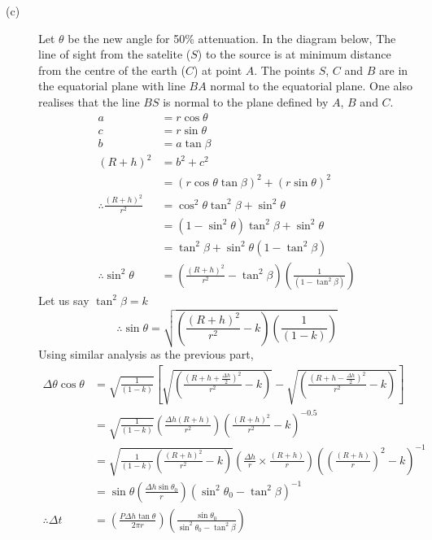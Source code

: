 \begin{description}
\item[(c)] Let $\theta$ be the new angle for 50\% attenuation. In the diagram
below, The line of sight from the satelite %
($S$) to the source is at minimum distance from the centre of the earth ($C$)
at point $A$. The points $S$, $C$ and $B$ are in the equatorial plane with
line $BA$ normal to the equatorial plane. One also realises that the line
$BS$ is normal to the plane defined by $A$, $B$ and $C$.
\begin{align*}
a &= r\cos\theta \\
c &= r\sin\theta \\
b &= a\tan\beta \\
(R + h)^2 &= b^2 + c^2 \\
  &= (r\cos\theta\tan\beta)^2 + (r\sin\theta)^2 \\
\therefore \frac{(R + h)^2}{r^2}
  &= \cos^2\theta\tan^2\beta + \sin^2\theta \\
  &= (1 - \sin^2\theta)\tan^2\beta + \sin^2\theta \\
  &= \tan^2\beta + \sin^2\theta(1 - \tan^2\beta) \\
\therefore \sin^2\theta
  &= \left(\frac{(R + h)^2}{r^2} - \tan^2\beta\right)
     \left(\frac{1}{(1 - \tan^2\beta)}\right)
\end{align*}
Let us say $\tan^2\beta = k$
\[
\therefore \sin\theta
  = \sqrt{\left(\frac{(R + h)^2}{r^2} - k\right)
    \left(\frac{1}{(1 - k)}\right)}
\]
Using similar analysis as the previous part,
\begin{align*}
\Delta\theta\cos\theta
  &= \sqrt{\frac{1}{(1 - k)}}
     \left[\sqrt{\left(\frac{(R + h + \frac{\Delta h}{2})^2}{r^2} - k\right)}
     - \sqrt{\left(\frac{(R + h - \frac{\Delta h}{2})^2}{r^2} - k\right)}
     \right] \\
  &= \sqrt{\frac{1}{(1 - k)}}
     \left(\frac{\Delta h (R + h)}{r^2}\right)
     \left(\frac{(R + h)^2}{r^2} - k\right)^{-0.5} \\
  &= \sqrt{\frac{1}{(1 - k)}
     \left(\frac{(R + h)^2}{r^2} - k\right)}
     \left(\frac{\Delta h}{r} \times \frac{(R + h)}{r}\right)
     \left(\left(\frac{(R + h)}{r}\right)^{2} - k\right)^{-1} \\
  &= \sin\theta\left(\frac{\Delta h\sin\theta_0}{r}\right)
     \left(\sin^2\theta_0 - \tan^2\beta\right)^{-1} \\
\therefore \Delta t
  &= \left(\frac{P\Delta h\tan\theta}{2\pi r}\right)
     \left(\frac{\sin\theta_0}{\sin^2\theta_0 - \tan^2\beta}\right)
\end{align*}
\end{description}

